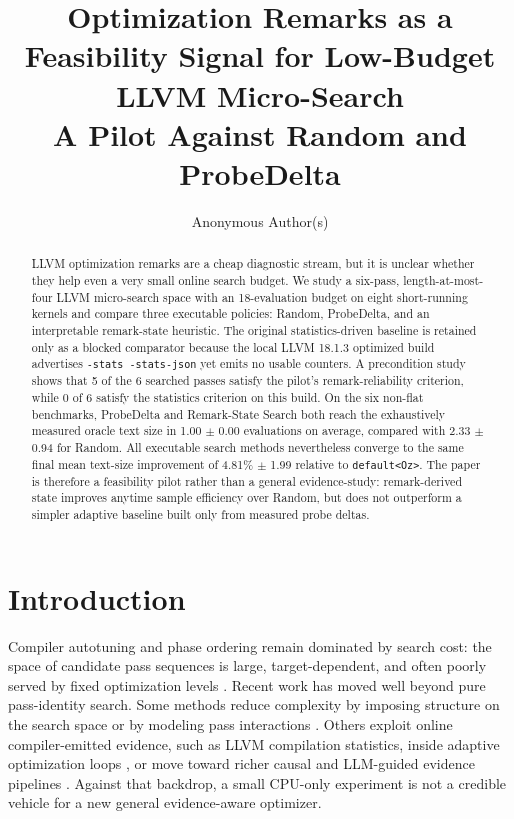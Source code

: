 \documentclass{article}
\title{Optimization Remarks as a Feasibility Signal for Low-Budget LLVM Micro-Search\\A Pilot Against Random and ProbeDelta}
\author{Anonymous Author(s)}
\date{}
\newcommand{\method}{Remark-State Search}
\begin{document}
\maketitle

\begin{abstract}
LLVM optimization remarks are a cheap diagnostic stream, but it is unclear whether they help even a very small online search budget. We study a six-pass, length-at-most-four LLVM micro-search space with an 18-evaluation budget on eight short-running kernels and compare three executable policies: Random, ProbeDelta, and an interpretable remark-state heuristic. The original statistics-driven baseline is retained only as a blocked comparator because the local LLVM 18.1.3 optimized build advertises \texttt{-stats -stats-json} yet emits no usable counters. A precondition study shows that 5 of the 6 searched passes satisfy the pilot's remark-reliability criterion, while 0 of 6 satisfy the statistics criterion on this build. On the six non-flat benchmarks, ProbeDelta and \method{} both reach the exhaustively measured oracle text size in 1.00 $\pm$ 0.00 evaluations on average, compared with 2.33 $\pm$ 0.94 for Random. All executable search methods nevertheless converge to the same final mean text-size improvement of 4.81\% $\pm$ 1.99 relative to \texttt{default<Oz>}. The paper is therefore a feasibility pilot rather than a general evidence-study: remark-derived state improves anytime sample efficiency over Random, but does not outperform a simpler adaptive baseline built only from measured probe deltas.
\end{abstract}

\section{Introduction}

Compiler autotuning and phase ordering remain dominated by search cost: the space of candidate pass sequences is large, target-dependent, and often poorly served by fixed optimization levels \citep{ashouri2018survey}. Recent work has moved well beyond pure pass-identity search. Some methods reduce complexity by imposing structure on the search space or by modeling pass interactions \citep{burgstaller2024osl,liu2024dco,pan2025synergistic}. Others exploit online compiler-emitted evidence, such as LLVM compilation statistics, inside adaptive optimization loops \citep{zhao2025citroen}, or move toward richer causal and LLM-guided evidence pipelines \citep{pan2026ecco}. Against that backdrop, a small CPU-only experiment is not a credible vehicle for a new general evidence-aware optimizer.
\end{document}
